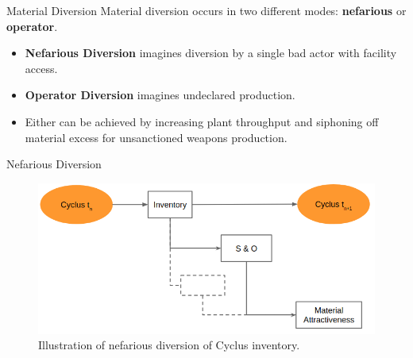 \documentclass[final]{beamer}
\newlength{\onecolwid}
\newlength{\threecolwid}
\begin{document}
\begin{frame}[t]
\begin{columns}[t,totalwidth=\threecolwid]
\begin{column}{\onecolwid}
\begin{block}{Material Diversion}
        Material diversion occurs in two different modes: \textbf{nefarious} or \textbf{operator}.
        \begin{itemize}
        \item \textbf{Nefarious Diversion} imagines diversion by a single bad actor with facility access.
        \item \textbf{Operator Diversion} imagines undeclared production.
        \item Either can be achieved by increasing plant throughput and siphoning off material excess for unsanctioned weapons production.
        \end{itemize}
        
        
	\begin{block} {Nefarious Diversion}
		\begin{figure}
			\includegraphics[width=0.9\linewidth]{diversion1.png}
			\caption{Illustration of nefarious diversion of Cyclus inventory.}
		\end{figure}
		

\end{block}
\end{block}
\end{column}
\end{columns}
\end{frame}
\end{document}
